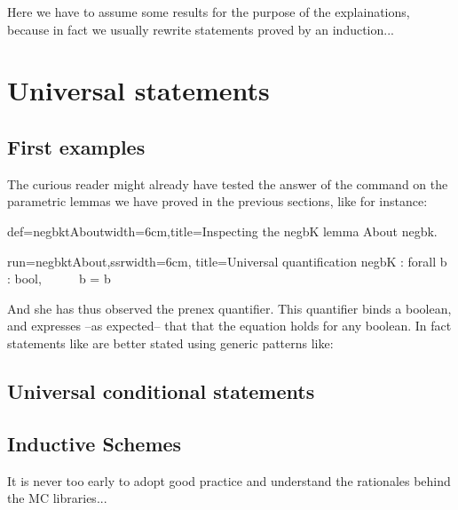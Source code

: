 Here we have to assume some results for the purpose of the
explainations, because in fact we usually rewrite statements proved by
an induction...
\section{Universal statements}

\subsection{First examples}
The curious reader might already have tested the answer of the
 command on the parametric lemmas we have proved in the
previous sections, like for instance:

\begin{coq}{def=negbktAbout}{width=6cm,title=Inspecting the negbK lemma}
About negbk.
\end{coq}
\begin{coqout}{run=negbktAbout,ssr}{width=6cm, title=Universal quantification}
negbK : forall b : bool, ~~ ~~ b = b
\end{coqout}

And she has thus observed the prenex  quantifier. This
quantifier binds a boolean, and expresses --as expected-- that that
the equation holds for any boolean. In fact statements like 
are better stated using generic patterns like:

\subsection{Universal conditional statements}

\subsection{Inductive Schemes}

It is never too early to adopt good practice and understand the
rationales behind the MC libraries...

